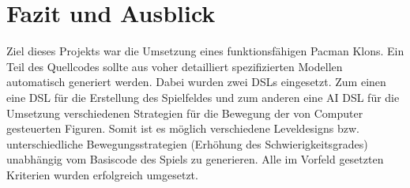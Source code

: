 \documentclass[conference]{IEEEtran}
\begin{document}
\section{Fazit und Ausblick}
Ziel dieses Projekts war die Umsetzung eines funktionsfähigen Pacman Klons. Ein Teil des Quellcodes sollte aus voher detailliert spezifizierten Modellen automatisch generiert werden.  Dabei wurden zwei DSLs eingesetzt. Zum einen eine DSL für die Erstellung des Spielfeldes und zum anderen eine AI DSL für die Umsetzung verschiedenen Strategien für die Bewegung der von Computer gesteuerten Figuren. Somit ist es möglich verschiedene Leveldesigns bzw. unterschiedliche Bewegungsstrategien (Erhöhung des Schwierigkeitsgrades) unabhängig vom Basiscode des Spiels zu generieren. Alle im Vorfeld gesetzten Kriterien wurden erfolgreich umgesetzt.
\end{document}
